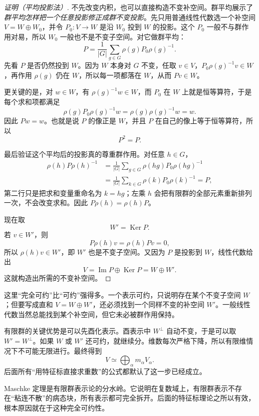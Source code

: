 \begin{proof}[证明（平均投影法）]
不先改变内积，也可以直接构造不变补空间。群平均展示了\emph{群平均怎样把一个任意投影修正成群不变投影}。先只用普通线性代数选一个补空间 $V=W\oplus W_0$，并令 $P_0:V\to W$ 是沿 $W_0$ 投到 $W$ 的投影。这个 $P_0$ 一般不与群作用对易，所以 $W_0$ 一般也不是不变子空间。对它做群平均：
\begin{equation}
P=\frac1{|G|}\sum_{g\in G}\rho(g)P_0\rho(g)^{-1}.
\label{eq:maschke-averaged-projector}
\end{equation}
先看 $P$ 是否仍然投到 $W$。因为 $W$ 本身对 $G$ 不变，任取 $v\in V$，$P_0\rho(g)^{-1}v\in W$，再作用 $\rho(g)$ 仍在 $W$，所以每一项都落在 $W$，从而 $Pv\in W$。

更关键的是，对 $w\in W$，有 $\rho(g)^{-1}w\in W$，而 $P_0$ 在 $W$ 上就是恒等算符，于是每个求和项都满足
\[
\rho(g)P_0\rho(g)^{-1}w
=\rho(g)\rho(g)^{-1}w=w.
\]
因此 $Pw=w$。也就是说 $P$ 的像正是 $W$，并且 $P$ 在自己的像上等于恒等算符，所以
\[
P^2=P.
\]

最后验证这个平均后的投影真的尊重群作用。对任意 $h\in G$，
\begin{align*}
\rho(h)P\rho(h)^{-1}
&=\frac1{|G|}\sum_{g\in G}
\rho(hg)P_0\rho(hg)^{-1}\\
&=\frac1{|G|}\sum_{k\in G}
\rho(k)P_0\rho(k)^{-1}=P,
\end{align*}
第二行只是把求和变量重命名为 $k=hg$；左乘 $h$ 会把有限群的全部元素重新排列一次，不会改变求和。因此 $P\rho(h)=\rho(h)P$。

现在取
\[
W'=\operatorname{Ker} P.
\]
若 $v\in W'$，则
\[
P\rho(h)v=\rho(h)Pv=0,
\]
所以 $\rho(h)v\in W'$，即 $W'$ 也是不变子空间。又因为 $P$ 是投影到 $W$，线性代数给出
\[
V=\operatorname{Im} P\oplus\operatorname{Ker} P=W\oplus W'.
\]
这就构造出所需的不变补空间。
\end{proof}


这里“完全可约”比“可约”强得多。一个表示可约，只说明存在某个不变子空间 $W$；但要写成直和 $V=W\oplus W'$，还必须找到一个同样不变的补空间 $W'$。一般线性代数当然总能找到某个补空间，但它未必被群作用保持。

有限群的关键优势是可以先酉化表示。酉表示中 $W^\perp$ 自动不变，于是可以取 $W'=W^\perp$。如果 $W$ 或 $W'$ 还可约，就继续分。维数每次严格下降，所以有限维情况下不可能无限进行。最终得到
\[
V\simeq\bigoplus_\alpha m_\alpha V_\alpha.
\]
后面所有“用特征标直接求重数”的公式都默认了这一步已经成立。


Maschke 定理是有限群表示论的分水岭。它说明在复数域上，有限群表示不存在“粘连不散”的病态块，所有表示都可完全拆开。后面的特征标理论之所以有效，根本原因就在于这种完全可约性。

